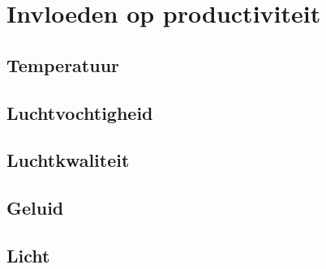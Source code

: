 
\section{Invloeden op productiviteit} \label{sec:theory}

\subsection{Temperatuur}
\subsection{Luchtvochtigheid}
\subsection{Luchtkwaliteit}
\subsection{Geluid}
\subsection{Licht}



